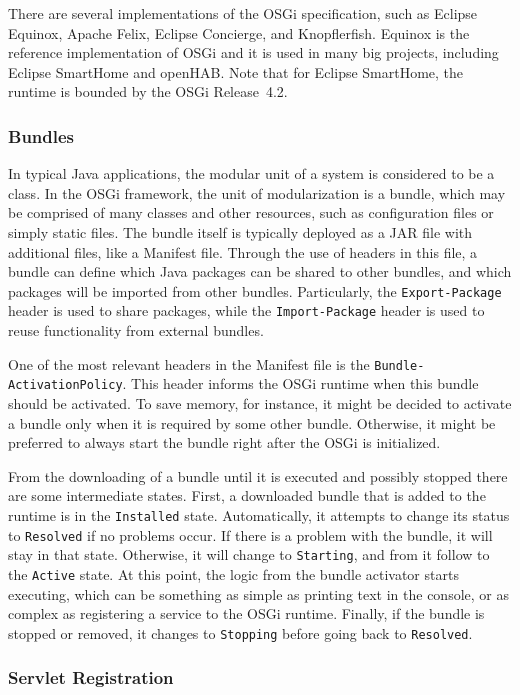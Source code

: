 \documentclass[12pt]{article}
\begin{document}
There are several implementations of the OSGi specification, such as Eclipse Equinox, Apache Felix, Eclipse Concierge, and Knopflerfish. Equinox is the reference implementation of OSGi and it is used in many big projects, including Eclipse SmartHome and openHAB. Note that for Eclipse SmartHome, the runtime is bounded by the OSGi Release~4.2. 

\subsubsection{Bundles}

In typical Java applications, the modular unit of a system is considered to be a class. In the OSGi framework, the unit of modularization is a bundle, which may be comprised of many classes and other resources, such as configuration files or simply static files. The bundle itself is typically deployed as a JAR file with additional files, like a Manifest file. Through the use of headers in this file, a bundle can define which Java packages can be shared to other bundles, and which packages will be imported from other bundles. Particularly, the \texttt{Export-Package} header is used to share packages, while the \texttt{Import-Package} header is used to reuse functionality from external bundles.

One of the most relevant headers in the Manifest file is the \texttt{Bundle-ActivationPolicy}. This header informs the OSGi runtime when this bundle should be activated. To save memory, for instance, it might be decided to activate a bundle only when it is required by some other bundle. Otherwise, it might be preferred to always start the bundle right after the OSGi is initialized. 

From the downloading of a bundle until it is executed and possibly stopped there are some intermediate states. First, a downloaded bundle that is added to the runtime is in the \texttt{Installed} state. Automatically, it attempts to change its status to \texttt{Resolved} if no problems occur. If there is a problem with the bundle, it will stay in that state. Otherwise, it will change to \texttt{Starting}, and from it follow to the \texttt{Active} state. At this point, the logic from the bundle activator starts executing, which can be something as simple as printing text in the console, or as complex as registering a service to the OSGi runtime. Finally, if the bundle is stopped or removed, it changes to \texttt{Stopping} before going back to \texttt{Resolved}.

\subsubsection{Servlet Registration}
\end{document}
